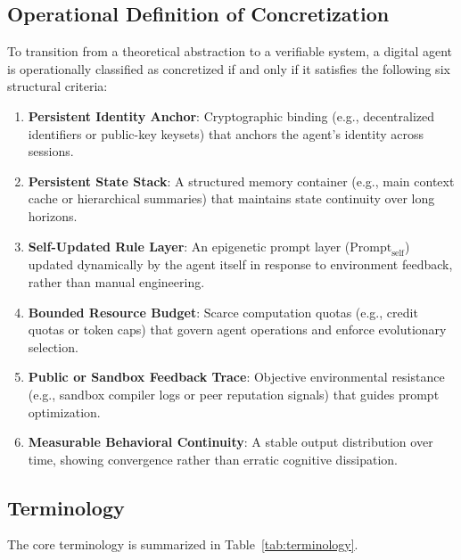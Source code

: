 \documentclass[10pt,journal,compsoc]{IEEEtran}
\begin{document}
\subsection{Operational Definition of Concretization}
To transition from a theoretical abstraction to a verifiable system, a digital agent is operationally classified as concretized if and only if it satisfies the following six structural criteria:
\begin{enumerate}
    \item \textbf{Persistent Identity Anchor}: Cryptographic binding (e.g., decentralized identifiers or public-key keysets) that anchors the agent's identity across sessions.
    \item \textbf{Persistent State Stack}: A structured memory container (e.g., main context cache or hierarchical summaries) that maintains state continuity over long horizons.
    \item \textbf{Self-Updated Rule Layer}: An epigenetic prompt layer ($\text{Prompt}_{\text{self}}$) updated dynamically by the agent itself in response to environment feedback, rather than manual engineering.
    \item \textbf{Bounded Resource Budget}: Scarce computation quotas (e.g., credit quotas or token caps) that govern agent operations and enforce evolutionary selection.
    \item \textbf{Public or Sandbox Feedback Trace}: Objective environmental resistance (e.g., sandbox compiler logs or peer reputation signals) that guides prompt optimization.
    \item \textbf{Measurable Behavioral Continuity}: A stable output distribution over time, showing convergence rather than erratic cognitive dissipation.
\end{enumerate}

\subsection{Terminology}
The core terminology is summarized in Table~\ref{tab:terminology}.
\end{document}
